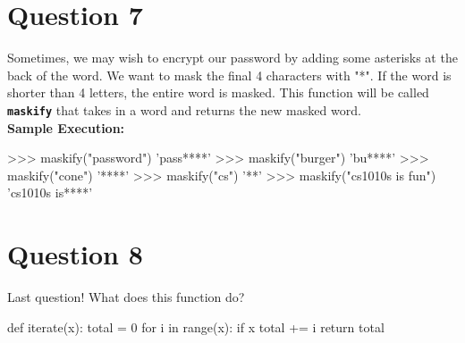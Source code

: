 \section{Question 7}
Sometimes, we may wish to encrypt our password by adding some asterisks at the back of the word. We want to mask the final 4 characters
with "*". If the word is shorter than 4 letters, the entire word is masked. This function will be called \texttt{\bfseries maskify} that takes in a word and
returns the new masked word. \\
\textbf{Sample Execution:}
\begin{python}
>>> maskify("password")
'pass****'
>>> maskify("burger")
'bu****'
>>> maskify("cone")
'****'
>>> maskify("cs")
'**'
>>> maskify("cs1010s is fun")
'cs1010s is****'
\end{python}

\section{Question 8}
Last question! What does this function do?
\begin{python}
def iterate(x):
    total = 0
    for i in range(x):
        if x %
            total += i
    return total
\end{python}

